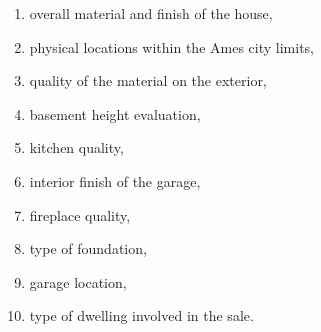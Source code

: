 \documentclass[
]{article}
\providecommand{\tightlist}{%
  \setlength{\itemsep}{0pt}\setlength{\parskip}{0pt}}
\begin{document}
\begin{enumerate}
\def\labelenumi{\arabic{enumi}.}
\tightlist
\item
  overall material and finish of the house,
\item
  physical locations within the Ames city limits,
\item
  quality of the material on the exterior,
\item
  basement height evaluation,
\item
  kitchen quality,
\item
  interior finish of the garage,
\item
  fireplace quality,
\item
  type of foundation,
\item
  garage location,
\item
  type of dwelling involved in the sale.
\end{enumerate}
\end{document}
